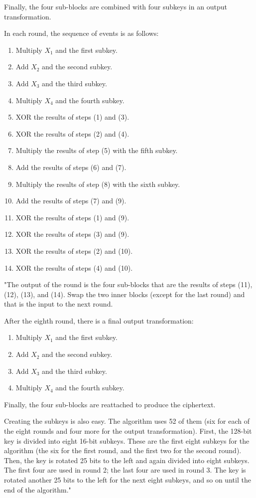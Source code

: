 \documentclass[a4paper,12pt,titlepage]{article}
\begin{document}
Finally, the four sub-blocks are combined with four subkeys in an output transformation.

In each round, the sequence of events is as follows:

\begin{enumerate}[noitemsep]
	\item Multiply $X_1$ and the first subkey.
	\item Add $X_2$ and the second subkey.
	\item Add $X_3$ and the third subkey.
	\item Multiply $X_4$ and the fourth subkey.
	\item XOR the results of steps (1) and (3).
	\item XOR the results of steps (2) and (4). 
	\item Multiply the results of step (5) with the fifth subkey. 
	\item Add the results of steps (6) and (7). 
	\item Multiply the results of step (8) with the sixth subkey. 
	\item Add the results of steps (7) and (9). 
	\item XOR the results of steps (1) and (9). 
	\item XOR the results of steps (3) and (9). 
	\item XOR the results of steps (2) and (10). 
	\item	XOR the results of steps (4) and (10). 
\end{enumerate}

"The output of the round is the four sub-blocks that are the results of steps  (11), (12), (13), and (14). Swap the two inner blocks (except for the last round) and that is the input to the next round. 

After the eighth round, there is a final output transformation:

\begin{enumerate}[noitemsep]
	\item Multiply $X_1$ and the first subkey.
	\item Add $X_2$ and the second subkey.
	\item Add $X_3$ and the third subkey.
	\item Multiply $X_4$ and the fourth subkey.
\end{enumerate}

Finally, the four sub-blocks are reattached to produce the ciphertext.

Creating the subkeys is also easy. The algorithm uses 52 of them (six for each of the eight rounds and four more for the output transformation). First, the 128-bit key is divided into eight 16-bit subkeys. These are the first eight subkeys for the algorithm (the six for the first round, and the first two for the second round). Then, the key is rotated 25 bits to the left and again divided into eight subkeys. The first four are used in round 2; the last four are used in round 3. The key is rotated another 25 bits to the left for the next eight subkeys, and so on until the end of the algorithm." \citep{schneier_applied_1996}
\end{document}
